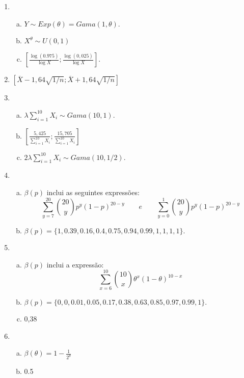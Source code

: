 \documentclass[10pt,brazil,addpoints]{exam}
\begin{document}
\begin{enumerate}[1.]

\item 

\begin{enumerate}[a)]
\item $Y\sim Exp(\theta)=Gama(1,\theta)$.
\item $X^\theta \sim U(0,1)$
\item $[\frac{\log(0.975)}{\log X} ; \frac{\log(0,025)}{\log X}]$.
\end{enumerate}

\item $[\overline{X}-1,64\sqrt{1/n};  \overline{X}+1,64\sqrt{1/n}]$


\item 
\begin{enumerate}[a)]
\item $\lambda\sum_{i=1}^{10} X_i \sim Gama(10,1)$.

\item $[\frac{5,425}{\sum_{i=1}^{10} X_i} ; \frac{15,705}{\sum_{i=1}^{10} X_i}]$

\item $2\lambda\sum_{i=1}^{10} X_i \sim Gama(10,1/2)$.
\end{enumerate}


\item 
\begin{enumerate}[a)]
\item $\beta(p)$ inclui as seguintes expressões:
$$
\sum_{y=7}^{20}  {20 \choose y}p^y(1-p)^{20-y} \qquad e \qquad \sum_{y=0}^1  {20 \choose y}p^y(1-p)^{20-y}
$$


\item $\beta(p) = \{1, 0.39, 0.16, 0.4, 0.75, 0.94, 0.99, 1, 1, 1, 1\}$. 
 
\end{enumerate}

\item 
\begin{enumerate}[a)]
 \item $\beta(p)$ inclui a expressão:
$$
\sum_{x=6}^{10}  {10 \choose x}\theta^x(1-\theta)^{10-x} 
$$
 
 \item $\beta(p) = \{0, 0, 0.01, 0.05, 0.17, 0.38, 0.63, 0.85, 0.97, 0.99, 1\}$. 
 
 \item 0,38
\end{enumerate}

\item 

\begin{enumerate}[a)]
 \item $\beta(\theta)=1-\frac{1}{2^\theta}$
 \item 0.5
\end{enumerate}



\end{enumerate}
\end{document}
